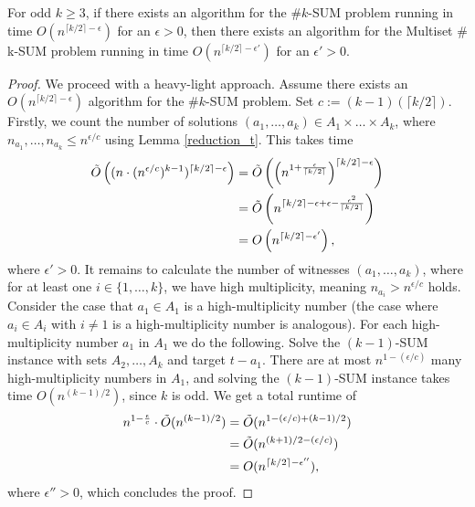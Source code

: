 \begin{lemma}
    For odd $k\geq 3$, if there exists an algorithm for the $\#k$-SUM problem running in time $O(n^{\lceil k/2 \rceil-\epsilon})$ for an $\epsilon>0$, then there exists an algorithm for the Multiset $\#$k-SUM problem running in time $O(n^{\lceil k/2 \rceil-\epsilon'})$ for an $\epsilon'>0$.
  \label{multisetToSet}  
  \end{lemma}
    \begin{proof}
    We proceed with a heavy-light approach.
    Assume there exists an $O(n^{\lceil k/2 \rceil -\epsilon})$ algorithm for the $ \#k$-SUM problem.
    Set $c:=(k-1)(\lceil k/2 \rceil)$.
    Firstly, we count the number of solutions $(a_1,\dots,a_k) \in A_1 \times \dots \times A_k$, where $n_{a_1},\dots, n_{a_k}\leq n^{ \epsilon/c}$ using  Lemma \ref{reduction_t}. This takes time
    \begin{align*}
	    \Tilde{O}\left( (n \cdot (n^{ \epsilon/c})^{k-1})^{\lceil k/2 \rceil -\epsilon} \right)&=\Tilde{O} \left(\left(n^{1+\frac{\epsilon}{\lceil k/2 \rceil }} \right )^{ \lceil k/2 \rceil -\epsilon}\right) \\
                                                              &= \Tilde{O} \left(n^{ {\lceil k/2 \rceil -\epsilon} + \epsilon  -\frac{ \epsilon ^2}{\lceil k/2 \rceil } }  \right) \\
                                                              &= O \left(n^ {\lceil k/2 \rceil -\epsilon'} \right),
    \end{align*}
    where $\epsilon'>0$.
    It remains to calculate the number of witnesses $(a_1,\dots,a_k)$, where for at least one $i \in \{1,\dots,k\}$, we have high multiplicity, meaning $n_{a_i}>n^{\epsilon/c}$ holds.
    Consider the case that $a_1 \in A_1$ is a high-multiplicity number (the case where $a_i \in A_i$ with $i\neq 1$  is a high-multiplicity number is analogous).
    For each high-multiplicity number $a_1$ in $A_1$ we do the following.
    Solve the $(k-1)$-SUM instance with sets $A_2,\dots ,A_k$ and target $t-a_1$.
    There are at most $n^{1-(\epsilon/c)}$ many high-multiplicity numbers in $A_1$, and solving the $(k-1)$-SUM instance takes time $O(n^{(k-1)/2})$, since $k$ is odd.
    We get a total runtime of 
    \begin{align*}
      n^{1-\frac{\epsilon}{c}} \cdot \Tilde{O}(n^{(k-1)/2})&=\Tilde{O}(n^{1-(\epsilon/c) +(k-1)/2})\\
                    &=\Tilde{O}(n^{(k+1)/2 -(\epsilon/c)})\\
                    &=O(n^{\lceil k/2 \rceil -\epsilon''}),
    \end{align*}
    where $\epsilon''>0$, which concludes the proof.
    \end{proof}



